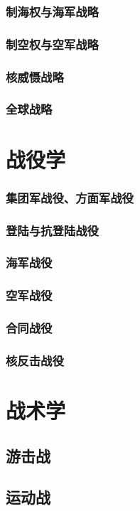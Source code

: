 \documentclass[UTF8]{../ApplicationUniverse}
\begin{document}
        \subsubsection{制海权与海军战略}
        \subsubsection{制空权与空军战略}
        \subsubsection{核威慑战略}
        \subsubsection{全球战略}
\section{战役学}
        \subsubsection{集团军战役、方面军战役}
        \subsubsection{登陆与抗登陆战役}
        \subsubsection{海军战役}
        \subsubsection{空军战役}
        \subsubsection{合同战役}
        \subsubsection{核反击战役}
\section{战术学}
    \subsection{游击战}
    \subsection{运动战}
\end{document}
